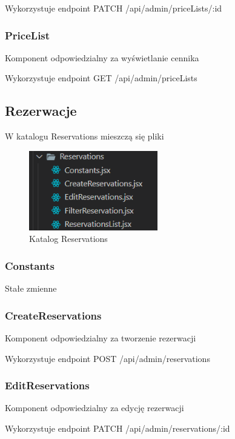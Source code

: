 \documentclass[titlepage]{article}
\begin{document}
\newline
Wykorzystuje endpoint PATCH /api/admin/priceLists/:id
\subsubsection{PriceList}
Komponent odpowiedzialny za wyświetlanie cennika

\newline
Wykorzystuje endpoint GET /api/admin/priceLists

\subsection{Rezerwacje}
W katalogu Reservations mieszczą się pliki

\begin{figure}[h]
\centering
\includegraphics[width=0.5\textwidth]{reservations-admin.png}

\caption{Katalog Reservations}
\label{fig:obrazek Reservations}
\end{figure}

\subsubsection{Constants}
Stałe zmienne

\subsubsection{CreateReservations}
Komponent odpowiedzialny za tworzenie rezerwacji

\newline
Wykorzystuje endpoint POST /api/admin/reservations

\subsubsection{EditReservations}
Komponent odpowiedzialny za edycję rezerwacji

\newline
Wykorzystuje endpoint PATCH /api/admin/reservations/:id
\end{document}

